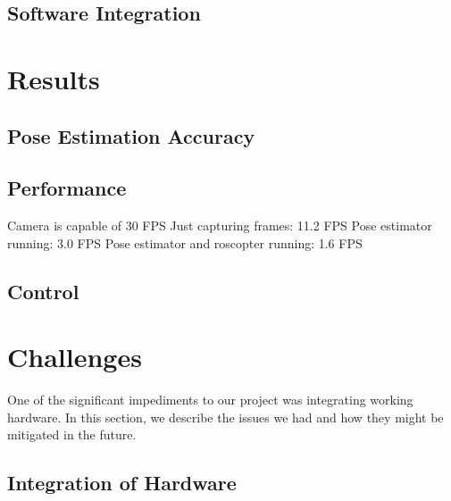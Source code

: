 \documentclass[10pt]{scrartcl} %
\begin{document}
\subsection{Software Integration}


\section{Results}

\subsection{Pose Estimation Accuracy}



\subsection{Performance}

Camera is capable of 30 FPS
Just capturing frames: 11.2 FPS
Pose estimator running: 3.0 FPS
Pose estimator and roscopter running: 1.6 FPS


\subsection{Control}

\section{Challenges}
One of the significant impediments to our project was integrating working hardware. In this section, we describe the issues we had and how they might be mitigated in the future.

\subsection{Integration of Hardware}
\end{document}
